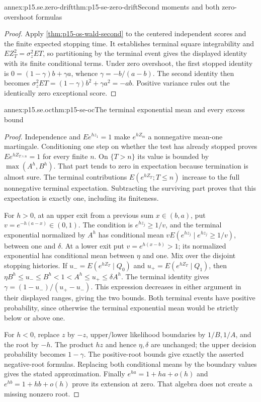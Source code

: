\begin{annexitem}{annex:p15.se.zero-drift}{thm:p15-se-zero-drift}{Second moments and both zero-overshoot formulas}
\begin{proof}
Apply \cref{thm:p15-os-wald-second} to the centered independent
scores and the finite expected stopping time. It establishes terminal
square integrability and \(EZ_T^2=\sigma_z^2ET\), so partitioning
by the terminal event gives the displayed identity with its finite
conditional terms. Under zero overshoot, the first stopped identity is
\(0=(1-\gamma)b+\gamma a\), whence
\(\gamma=-b/(a-b)\). The second identity then becomes
\(\sigma_z^2ET=(1-\gamma)b^2+\gamma a^2=-ab\).
Positive variance rules out the identically zero exceptional score.
\end{proof}
\end{annexitem}

\begin{annexitem}{annex:p15.se.oc}{thm:p15-se-oc}{The terminal exponential mean and every excess bound}
\begin{proof}
Independence and \(Ee^{hz_1}=1\) make \(e^{hZ_m}\) a
nonnegative mean-one martingale. Conditioning one step on whether the
test has already stopped proves \(Ee^{hZ_{T\wedge n}}=1\) for
every finite \(n\). On \(\{T>n\}\) its value is bounded by
\(\max(A^h,B^h)\). That part tends to zero in expectation because
termination is almost sure. The terminal contributions
\(E(e^{hZ_T};T\leq n)\) increase to the full nonnegative terminal
expectation. Subtracting the surviving part proves that this expectation
is exactly one, including its finiteness.

For \(h>0\), at an upper exit from a previous sum \(x\in(b,a)\),
put \(v=e^{-h(a-x)}\in(0,1)\). The condition is
\(e^{hz_j}\geq1/v\), and the terminal exponential normalized by
\(A^h\) has conditional mean
\(vE(e^{hz_j}\mid e^{hz_j}\geq1/v)\), between one and
\(\delta\). At a lower exit put \(v=e^{h(x-b)}>1\); its
normalized exponential has conditional mean between \(\eta\) and one.
Mix over the disjoint stopping histories. If
\(u_-=E(e^{hZ_T}\mid Q_0)\) and
\(u_+=E(e^{hZ_T}\mid Q_1)\), then
\(\eta B^h\leq u_-\leq B^h<1<A^h\leq u_+\leq\delta A^h\).
The terminal identity gives
\(\gamma=(1-u_-)/(u_+-u_-)\). This expression decreases in either
argument in their displayed ranges, giving the two bounds.
Both terminal events have positive probability, since otherwise the
terminal exponential mean would be strictly below or above one.

For \(h<0\), replace \(z\) by \(-z\), upper/lower likelihood
boundaries by \(1/B,1/A\), and the root by \(-h\). The product
\(hz\) and hence \(\eta,\delta\) are unchanged; the upper decision
probability becomes \(1-\gamma\). The positive-root bounds give exactly
the asserted negative-root formulas. Replacing both conditional means
by the boundary values gives the stated approximation. Finally
\(e^{ha}=1+ha+o(h)\) and \(e^{hb}=1+hb+o(h)\) prove its
extension at zero. That algebra does not create a missing nonzero root.
\end{proof}
\end{annexitem}

